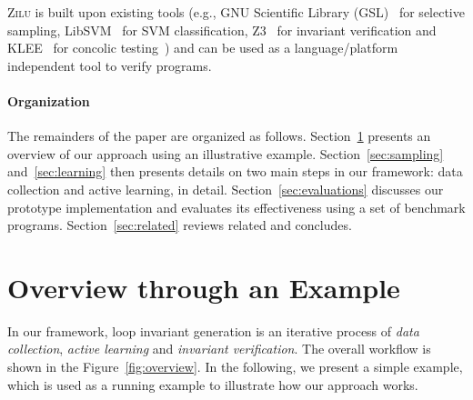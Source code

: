     \textsc{Zilu} is built upon existing tools (e.g., GNU Scientific Library (GSL)~\cite{gough2009gnu} for selective sampling,
    LibSVM~\cite{chang2011libsvm} for SVM classification,
    Z3~\cite{de2008z3} for invariant verification
    and KLEE~\cite{cadar2008klee} for concolic testing~\cite{sen2007concolic}) and can be used as a language/platform independent tool to verify programs.

\paragraph{Organization} The remainders of the paper are organized as follows. Section~\ref{sec:overview} presents an overview of our approach using an illustrative example. Section~\ref{sec:sampling} and~\ref{sec:learning} then presents details on two main steps in our framework: data collection and active learning, in detail. Section~\ref{sec:evaluations} discusses our prototype implementation and evaluates its effectiveness using a set of benchmark programs. Section~\ref{sec:related} reviews related and concludes.

\section{Overview through an Example} \label{sec:overview}
In our framework, loop invariant generation is an iterative process of \emph{data collection}, \emph{active learning} and \emph{invariant verification}. The overall workflow is shown in the Figure~\ref{fig:overview}. In the following, we present a simple example, which is used as a running example to illustrate how our approach works.

